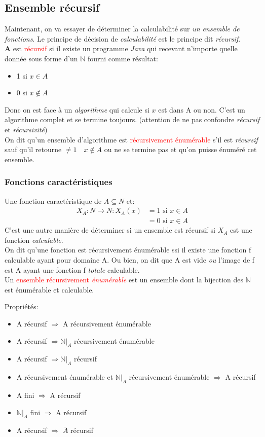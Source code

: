 \documentclass{report}
\begin{document}
\subsection{Ensemble récursif}
Maintenant, on va essayer de déterminer la calculabilité sur \textit{un ensemble de fonctions}.
Le principe de décision de \textit{calculabilité} est le principe dit \textit{récursif}.\\
\textbf{A} est \textcolor{red}{récursif} si il existe un programme \textit{Java} qui recevant n'importe quelle donnée sous forme d'un $\mathbb{N}$ fourni comme résultat:
\begin{itemize}
\item 1 si $x \in A$
\item 0 si $x \notin A$
\end{itemize}
Donc on est face à un \textit{algorithme} qui calcule si $x$ est dans A ou non. C'est un algorithme complet et se termine toujours. (attention de ne pas confondre \textit{récursif} et \textit{récursivité})\\

On dit qu'un ensemble d'algorithme est \textcolor{red}{récursivement énumérable} s'il est \textit{récursif} sauf qu'il retourne $\neq 1 \quad x \notin A$ ou ne se termine pas et qu'on puisse énuméré cet ensemble.

\subsubsection{Fonctions caractéristiques} \label{caract}
Une fonction caractéristique de $A \subseteq N$ et:
\begin{align*}
X_A : N \rightarrow N : X_A(x) &= 1 \text{ si } x \in A\\
&= 0 \text{ si } x \in A
\end{align*} 
C'est une autre manière de déterminer si un ensemble est récursif si $X_A$ est une fonction \textit{calculable}.\\
On dit qu'une fonction est récursivement énumérable ssi il existe une fonction f calculable ayant pour domaine A. Ou bien, on dit que A est vide \textit{ou} l'image de f est A ayant une fonction f \textit{totale} calculable.\\
Un \textcolor{red}{ensemble récursivement \textit{énumérable}} est un ensemble dont la bijection des $\mathbb{N}$ est énumérable et calculable.

Propriétés:
\begin{itemize}
\item A récursif $\Rightarrow$ A récursivement énumérable 
\item A récursif $\Rightarrow \mathbb{N}\vert_A$ récursivement énumérable 
\item A récursif $\Rightarrow \mathbb{N}\vert_A$ récursif 
\item A récursivement énumérable et $\mathbb{N}\vert_A$ récursivement énumérable $\Rightarrow$ A récursif 
\item A fini $\Rightarrow$ A récursif
\item $\mathbb{N}\vert_A$ fini $\Rightarrow$ A récursif
\item A récursif $\Rightarrow$ $\bar{A}$ récursif
\end{itemize}
\end{document}
